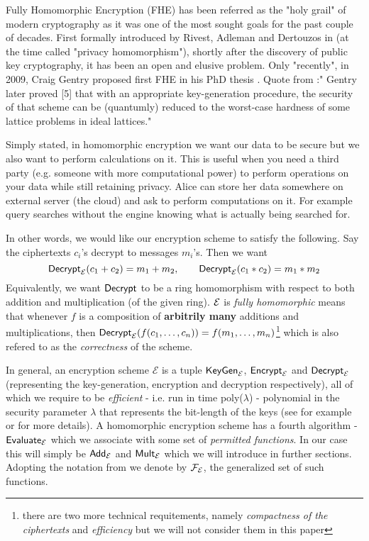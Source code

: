 Fully Homomorphic Encryption (FHE) has been referred as the "holy grail" of modern cryptography as it was one of the most sought goals for the past couple of decades. First formally introduced by Rivest, Adleman and Dertouzos in \cite{primal} (at the time called "privacy homomorphism"), shortly after the discovery of public key cryptography, it has been an open and elusive problem. Only "recently", in 2009, Craig Gentry proposed first FHE in his PhD thesis \cite{gentry_phd}. Quote from \cite{impl_gentry}:"  Gentry later proved [5] that with an appropriate key-generation procedure, the security of that scheme can be (quantumly) reduced to the worst-case hardness of some lattice problems in ideal lattices."

Simply stated, in homomorphic encryption we want our data to be secure but we also want to perform calculations on it. This is useful when you need a third party (e.g. someone with more computational power) to perform operations on your data while still retaining privacy. Alice can store her data somewhere on external server (the cloud) and ask to perform computations on it. For example query searches without the engine knowing what is actually being searched for.

In other words, we would like our encryption scheme to satisfy the following. Say the ciphertexts $c_i$'s decrypt to messages $m_i$'s. Then we want
$$ \alg{Decrypt}_{\E}(c_1 + c_2) = m_1 + m_2, \qquad \alg{Decrypt}_{\E}(c_1*c_2) = m_1*m_2$$
Equivalently, we want $\alg{Decrypt}$ to be a ring homomorphism with respect to both addition and multiplication (of the given ring). $\mathcal{E}$ is \textit{fully homomorphic} means that whenever $f$ is a composition of \textbf{arbitrily many} additions and multiplications, then $\alg{Decrypt}_{\E}(f(c_1, \dots, c_n)) = f(m_1, \dots, m_n)$\footnote{there are two more technical requitements, namely \textit{compactness of the ciphertexts} and \textit{efficiency} but we will not consider them in this paper} which is also refered to as the \textit{correctness} of the scheme.

\begin{remark} \label{algs}
    In general, an encryption scheme $\mathcal{E}$ is a tuple $\alg{KeyGen}_{\E}$, $\alg{Encrypt}_{\E}$ and $\alg{Decrypt}_{\E}$ (representing the key-generation, encryption and decryption respectively), all of which we require to be \textit{efficient} - i.e. run in time poly($\lambda$) - polynomial in the security parameter $\lambda$ that represents the bit-length of the keys (see for example \cite{katz} or \cite{book} for more details). A homomorphic encryption scheme has a fourth algorithm - $\alg{Evaluate}_{\E}$ which we associate with some set of \textit{permitted functions}. In our case this will simply be $\alg{Add}_{\E}$ and $\alg{Mult}_{\E}$ which we will introduce in further sections. Adopting the notation from \cite{easy_fhe} we denote by $\mathcal{F}_{\mathcal{E}}$, the generalized set of such functions.
\end{remark}

